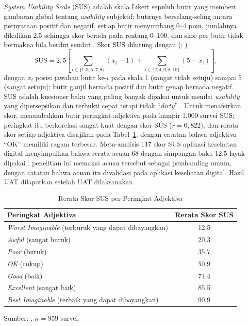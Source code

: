 \textit{System Usability Scale} (SUS) adalah skala Likert sepuluh butir yang memberi gambaran global tentang \textit{usability} subjektif; butirnya berselang-seling antara pernyataan positif dan negatif, setiap butir menyumbang 0--4 poin, jumlahnya dikalikan 2,5 sehingga skor berada pada rentang 0--100, dan skor per butir tidak bermakna bila berdiri sendiri \citep*{brooke1996sus}. Skor SUS dihitung dengan (\citealp*{brooke1996sus}; \citealp{hyzy2022system})
\begin{equation}
\mathrm{SUS} = 2{,}5 \left[\sum_{i \in \{1,3,5,7,9\}} (x_i - 1) + \sum_{i \in \{2,4,6,8,10\}} (5 - x_i)\right],
\label{eq:sus}
\end{equation}
dengan $x_i$ posisi jawaban butir ke-$i$ pada skala 1 (sangat tidak setuju) sampai 5 (sangat setuju); butir ganjil bernada positif dan butir genap bernada negatif. SUS adalah kuesioner baku yang paling banyak dipakai untuk menilai \textit{usability} yang dipersepsikan dan terbukti cepat tetapi tidak ``\textit{dirty}'' \citep*{lewis2018system}. Untuk menafsirkan skor, \citet*{bangor2009determining} menambahkan butir peringkat adjektiva pada hampir 1.000 survei SUS; peringkat itu berkorelasi sangat kuat dengan skor SUS ($r = 0{,}822$), dan rerata skor setiap adjektiva disajikan pada Tabel~\ref{tab:sus-adjektiva}, dengan catatan bahwa adjektiva ``OK'' memiliki ragam terbesar. Meta-analisis 117 skor SUS aplikasi kesehatan digital menyimpulkan bahwa rerata acuan 68 dengan simpangan baku 12,5 layak dipakai \citep{hyzy2022system}; penelitian ini memakai acuan tersebut sebagai pembanding umum, dengan catatan bahwa acuan itu divalidasi pada aplikasi kesehatan digital. Hasil UAT dilaporkan setelah UAT dilaksanakan.

\begin{table}[!htb]
\centering
\caption{Rerata Skor SUS per Peringkat Adjektiva}
\label{tab:sus-adjektiva}
{\small
{}
\begin{tabular}{@{}lc@{}}
\toprule
\textbf{Peringkat Adjektiva} & \textbf{Rerata Skor SUS} \\
\midrule
\textit{Worst Imaginable} (terburuk yang dapat dibayangkan) & 12,5 \\
\textit{Awful} (sangat buruk) & 20,3 \\
\textit{Poor} (buruk) & 35,7 \\
\textit{OK} (cukup) & 50,9 \\
\textit{Good} (baik) & 71,4 \\
\textit{Excellent} (sangat baik) & 85,5 \\
\textit{Best Imaginable} (terbaik yang dapat dibayangkan) & 90,9 \\
\bottomrule
\end{tabular}}

\vspace{2pt}
{\footnotesize Sumber: \citet*{bangor2009determining}, $n = 959$ survei.}
\end{table}

